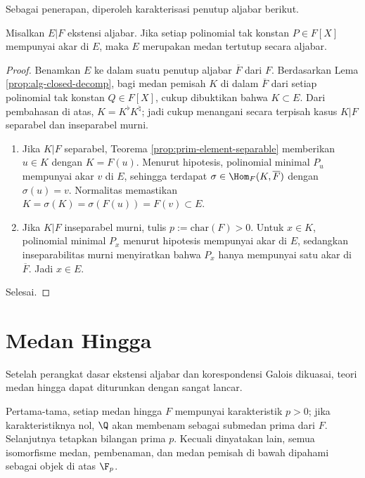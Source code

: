 Sebagai penerapan, diperoleh karakterisasi penutup aljabar berikut.
\begin{proposition}\label{prop:alg-closed-root}
	Misalkan $E|F$ ekstensi aljabar. Jika setiap polinomial tak konstan $P\in F[X]$ mempunyai akar di $E$, maka $E$ merupakan medan tertutup secara aljabar.
\end{proposition}
\begin{proof}
	Benamkan $E$ ke dalam suatu penutup aljabar $\overline{F}$ dari $F$. Berdasarkan Lema \ref{prop:alg-closed-decomp}, bagi medan pemisah $K$ di dalam $\overline{F}$ dari setiap polinomial tak konstan $Q \in F[X]$, cukup dibuktikan bahwa $K \subset E$. Dari pembahasan di atas, $K = K^\flat K^\natural$; jadi cukup menangani secara terpisah kasus $K|F$ separabel dan inseparabel murni.
	
	\begin{enumerate}
		\item Jika $K|F$ separabel, Teorema \ref{prop:prim-element-separable} memberikan $u\in K$ dengan $K=F(u)$. Menurut hipotesis, polinomial minimal $P_u$ mempunyai akar $v$ di $E$, sehingga terdapat $\sigma\in\Hom_F(K,\overline{F})$ dengan $\sigma(u)=v$. Normalitas memastikan $K=\sigma(K)=\sigma(F(u))=F(v)\subset E$.
		\item Jika $K|F$ inseparabel murni, tulis $p:=\text{char}(F)>0$. Untuk $x\in K$, polinomial minimal $P_x$ menurut hipotesis mempunyai akar di $E$, sedangkan inseparabilitas murni menyiratkan bahwa $P_x$ hanya mempunyai satu akar di $\overline{F}$. Jadi $x\in E$.
	\end{enumerate}
	Selesai.
\end{proof}

\section{Medan Hingga}
Setelah perangkat dasar ekstensi aljabar dan korespondensi Galois dikuasai, teori medan hingga dapat diturunkan dengan sangat lancar.

Pertama-tama, setiap medan hingga $F$ mempunyai karakteristik $p>0$; jika karakteristiknya nol, $\Q$ akan membenam sebagai submedan prima dari $F$. Selanjutnya tetapkan bilangan prima $p$. Kecuali dinyatakan lain, semua isomorfisme medan, pembenaman, dan medan pemisah di bawah dipahami sebagai objek di atas $\F_p$.

